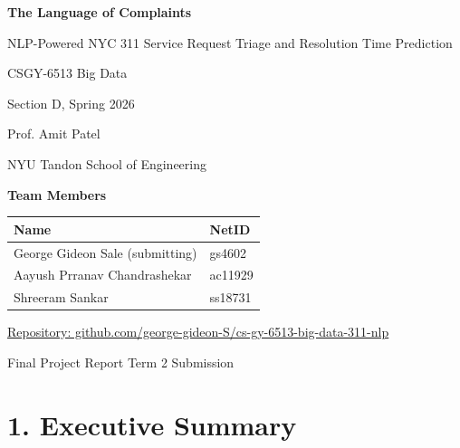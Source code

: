 \documentclass[11pt,letterpaper]{article}
\begin{document}
\begin{titlepage}
  \centering
  \vspace*{1in}
  {\Huge\bfseries The Language of Complaints \par}
  \vspace{0.4cm}
  {\Large NLP-Powered NYC 311 Service Request Triage and Resolution Time Prediction \par}
  \vspace{1.5cm}
  {\Large CSGY-6513 Big Data \par Section D, Spring 2026 \par}
  \vspace{0.5cm}
  {\large Prof. Amit Patel \par NYU Tandon School of Engineering \par}
  \vspace{2cm}
  {\large \textbf{Team Members} \par}
  \vspace{0.4cm}
  \begin{tabular}{ll}
    \toprule
    Name & NetID \\
    \midrule
    George Gideon Sale (submitting) & gs4602 \\
    Aayush Prranav Chandrashekar & ac11929 \\
    Shreeram Sankar & ss18731 \\
    \bottomrule
  \end{tabular}
  \vfill
  {\large \href{https://github.com/george-gideon-S/cs-gy-6513-big-data-311-nlp}{Repository: github.com/george-gideon-S/cs-gy-6513-big-data-311-nlp} \par}
  \vspace{0.5cm}
  {\small Final Project Report \textbar{} Term 2 Submission \par}
\end{titlepage}

\tableofcontents
\newpage

\section{1. Executive Summary}
\end{document}
